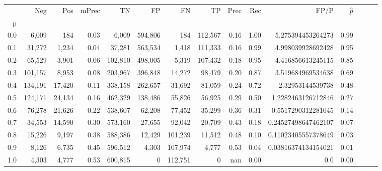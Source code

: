 \begin{tabular}{rrrrrrrrrrrrrrr}
\toprule
{} &      Neg &     Pos & mPrec &       TN &       FP &       FN &       TP &  Prec &   Rec &                 FP/P & $\hat{p}$ \\
p   &          &         &       &          &          &          &          &       &       &                      &           \\
\midrule
0.0 &    6,009 &     184 &  0.03 &    6,009 &  594,806 &      184 &  112,567 &  0.16 &  1.00 &    5.275394453264273 &      0.99 \\
0.1 &   31,272 &   1,234 &  0.04 &   37,281 &  563,534 &    1,418 &  111,333 &  0.16 &  0.99 &    4.998039928692428 &      0.95 \\
0.2 &   65,529 &   3,901 &  0.06 &  102,810 &  498,005 &    5,319 &  107,432 &  0.18 &  0.95 &    4.416856613245115 &      0.85 \\
0.3 &  101,157 &   8,953 &  0.08 &  203,967 &  396,848 &   14,272 &   98,479 &  0.20 &  0.87 &    3.519684969534638 &      0.69 \\
0.4 &  134,191 &  17,420 &  0.11 &  338,158 &  262,657 &   31,692 &   81,059 &  0.24 &  0.72 &     2.32953144539738 &      0.48 \\
0.5 &  124,171 &  24,134 &  0.16 &  462,329 &  138,486 &   55,826 &   56,925 &  0.29 &  0.50 &   1.2282463126712846 &      0.27 \\
0.6 &   76,278 &  21,626 &  0.22 &  538,607 &   62,208 &   77,452 &   35,299 &  0.36 &  0.31 &   0.5517290312281045 &      0.14 \\
0.7 &   34,553 &  14,590 &  0.30 &  573,160 &   27,655 &   92,042 &   20,709 &  0.43 &  0.18 &  0.24527498647462107 &      0.07 \\
0.8 &   15,226 &   9,197 &  0.38 &  588,386 &   12,429 &  101,239 &   11,512 &  0.48 &  0.10 &  0.11023405557378649 &      0.03 \\
0.9 &    8,126 &   6,735 &  0.45 &  596,512 &    4,303 &  107,974 &    4,777 &  0.53 &  0.04 &  0.03816374134154021 &      0.01 \\
1.0 &    4,303 &   4,777 &  0.53 &  600,815 &        0 &  112,751 &        0 &   nan &  0.00 &                  0.0 &      0.00 \\
\bottomrule
\end{tabular}
